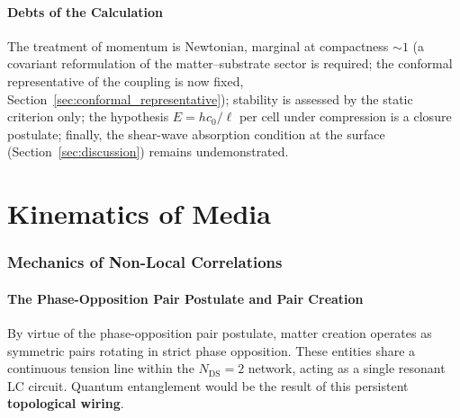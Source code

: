 \documentclass[11pt,a4paper]{article}
\theoremstyle{plain}
\theoremstyle{remark}
\newcommand{\Ncd}{\ensuremath{N_{\mathrm{DS}}}}
\begin{document}
\subsection{Debts of the Calculation}
The treatment of momentum is Newtonian, marginal at compactness $\sim1$ (a covariant reformulation of the matter--substrate sector is required; the conformal representative of the coupling is now fixed, Section~\ref{sec:conformal_representative}); stability is assessed by the static criterion only; the hypothesis $E = hc_0/\ell$ per cell under compression is a closure postulate; finally, the shear-wave absorption condition at the surface (Section~\ref{sec:discussion}) remains undemonstrated.

\part{Kinematics of Media}

\section{Mechanics of Non-Local Correlations}
\label{sec:nonlocal_correlations}

\subsection{The Phase-Opposition Pair Postulate and Pair Creation}
By virtue of the phase-opposition pair postulate, matter creation operates as symmetric pairs rotating in strict phase opposition. These entities share a continuous tension line within the $\Ncd = 2$ network, acting as a single resonant LC circuit. Quantum entanglement would be the result of this persistent \textbf{topological wiring}.
\end{document}
